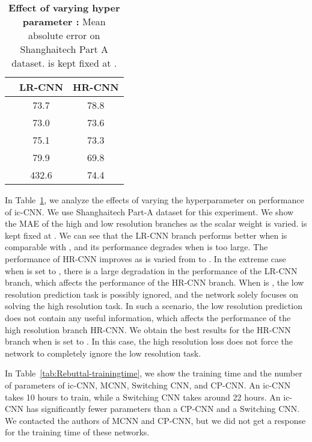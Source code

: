 \documentclass[runningheads]{llncs}
\begin{document}
\setlength{\tabcolsep}{25pt}
\begin{table}[!t]
\centering
\caption{{\bf Effect of varying hyper parameter :} Mean absolute error on Shanghaitech Part A dataset.  is kept fixed at .
}
\begin{tabular}{lcc}
\toprule
     & LR-CNN   & HR-CNN   \\
\midrule
  & 73.7  & 78.8  \\
  & 73.0  & 73.6 \\
   & 75.1  & 73.3 \\
  & 79.9  &  69.8 \\
  &  432.6  & 74.4 \\
\bottomrule
\end{tabular}
\label{tab:tableLossWeights}
\end{table}

 In Table~\ref{tab:tableLossWeights}, we analyze the effects of varying the hyperparameter  on performance of ic-CNN. We use Shanghaitech Part-A dataset for this experiment. We show the MAE of the high and low resolution branches as the scalar weight  is varied.  is kept fixed at . We can see that the
LR-CNN branch performs better when  is comparable with , and its performance degrades when  is too large. The performance of HR-CNN improves as  is varied from  to . In the extreme case when  is set to , there is a large degradation in the performance of the LR-CNN branch, which affects the performance of the HR-CNN branch. When  is , the low resolution prediction task is possibly ignored, and the network solely focuses on solving the high resolution task. In such a scenario, the low resolution prediction does not contain any useful information, which affects the performance of the high resolution branch HR-CNN. We obtain the best results for the HR-CNN branch
when  is set to . In this case, the high resolution loss does not force the network to completely ignore the low resolution task.




In Table~\ref{tab:Rebuttal-trainingtime}, we show the training time and the number of parameters of ic-CNN, MCNN, Switching CNN, and CP-CNN. An ic-CNN takes 10 hours to train, while a Switching CNN takes around 22 hours. An ic-CNN has significantly fewer parameters than a CP-CNN and a Switching CNN. We contacted the authors of MCNN and CP-CNN, but we did not get a response for the training time of these networks.
\end{document}
